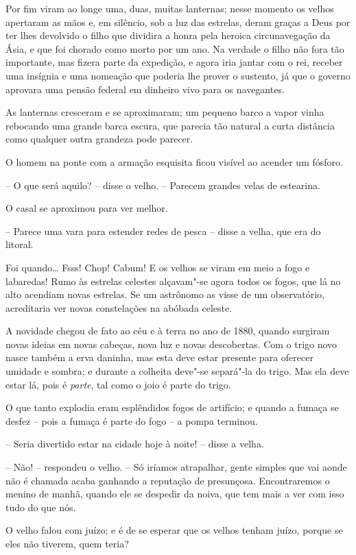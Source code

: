 Por fim viram ao longe uma, duas, muitas lanternas; nesse momento os
velhos apertaram as mãos e, em silêncio, sob a luz das estrelas, deram
graças a Deus por ter lhes devolvido o filho que dividira a honra pela
heroica circunavegação da Ásia, e que foi chorado como morto por um
ano. Na verdade o filho não fora tão importante, mas fizera parte da
expedição, e agora iria jantar com o rei, receber uma insígnia e uma
nomeação que poderia lhe prover o sustento, já que o governo aprovara
uma pensão federal em dinheiro vivo para os navegantes.

As lanternas cresceram e se aproximaram; um pequeno barco a vapor vinha
rebocando uma grande barca escura, que parecia tão natural a curta
distância como qualquer outra grandeza pode parecer. 

O homem na ponte com a armação esquisita ficou visível ao acender um
fósforo.

-- O que será aquilo? -- disse o velho. -- Parecem grandes velas de
estearina.

O casal se aproximou para ver melhor.

-- Parece uma vara para estender redes de pesca -- disse a velha, que era
do litoral.

Foi quando\ldots{} Fsss! Chop! Cabum! E os velhos se viram em meio a fogo e
labaredas! Rumo às estrelas celestes alçavam"-se agora todos os fogos,
que lá no alto acendiam novas estrelas. Se um astrônomo as visse de um
observatório, acreditaria ver novas constelações na abóbada celeste.

A novidade chegou de fato ao céu e à terra no ano de 1880, quando
surgiram novas ideias em novas cabeças, nova luz e novas descobertas.
Com o trigo novo nasce também a erva daninha, mas esta deve estar
presente para oferecer umidade e sombra; e durante a colheita deve"-se
separá"-la do trigo. Mas ela deve estar lá, pois é \textit{parte}, tal
como o joio é parte do trigo.

O que tanto explodia eram esplêndidos fogos de artifício; e quando a
fumaça se desfez -- pois a fumaça é parte do fogo -- a pompa terminou. 

-- Seria divertido estar na cidade hoje à noite! -- disse a velha.

-- Não! -- respondeu o velho. -- Só iríamos atrapalhar, gente simples que
vai aonde não é chamada acaba ganhando a reputação de presunçosa.
Encontraremos o menino de manhã, quando ele se despedir da noiva, que
tem mais a ver com isso tudo do que nós.

O velho falou com juízo; e é de se esperar que os velhos tenham juízo,
porque se eles não tiverem, quem teria? 

